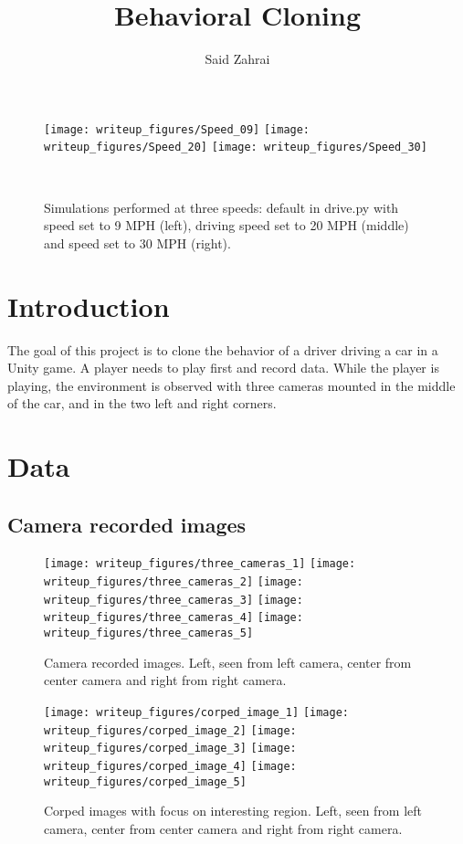 \documentclass[12pt,a4paper]{article}
\author{Said Zahrai}
\title{Behavioral Cloning}
\begin{document}
	\maketitle
	
		\begin{figure}[H]
		\centering
		\texttt{[image: writeup\_figures/Speed\_09]}
		\texttt{[image: writeup\_figures/Speed\_20]}
		\texttt{[image: writeup\_figures/Speed\_30]}
		\caption{Simulations performed at three speeds: default in drive.py with speed set to 9 MPH (left), driving speed set to 20 MPH (middle) and speed set to 30 MPH (right).}
		\label{fig:simulations}\\
		
	\end{figure}
	
	\section{Introduction}
	The goal of this project is to clone the behavior of a driver driving a car in a Unity game. A player needs to play first and record data. While the player is playing, the environment is observed with three cameras mounted in the middle of the car, and in the two left and right corners.
	\section{Data}
	\subsection{Camera recorded images}
	\begin{figure}[H]
		\centering
		\texttt{[image: writeup\_figures/three\_cameras\_1]}
		\texttt{[image: writeup\_figures/three\_cameras\_2]}
		\texttt{[image: writeup\_figures/three\_cameras\_3]}
		\texttt{[image: writeup\_figures/three\_cameras\_4]}
		\texttt{[image: writeup\_figures/three\_cameras\_5]}
		\caption{Camera recorded images. Left, seen from left camera, center from center camera and right from right camera.}
		\label{fig:threecameras}
	\end{figure}

	\begin{figure}[H]
		\centering
		\texttt{[image: writeup\_figures/corped\_image\_1]}
		\texttt{[image: writeup\_figures/corped\_image\_2]}
		\texttt{[image: writeup\_figures/corped\_image\_3]}
		\texttt{[image: writeup\_figures/corped\_image\_4]}
		\texttt{[image: writeup\_figures/corped\_image\_5]}
		\caption{Corped images with focus on interesting region. Left, seen from left camera, center from center camera and right from right camera.}
		\label{fig:corpedimages}
	\end{figure}
\end{document}
